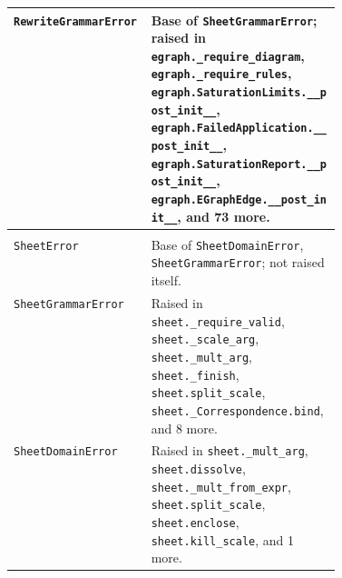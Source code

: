 {\begin{xltabular}{\linewidth}{@{}>{\raggedright\arraybackslash}p{0.42\linewidth}X@{}}
\texttt{RewriteGrammarError}\newline{} & Base of \texttt{SheetGrammarError}; raised in \texttt{egraph.\allowbreak{}\_\allowbreak{}require\_\allowbreak{}diagram}, \texttt{egraph.\allowbreak{}\_\allowbreak{}require\_\allowbreak{}rules}, \texttt{egraph.\allowbreak{}SaturationLimits.\allowbreak{}\_\allowbreak{}\_\allowbreak{}post\_\allowbreak{}init\_\allowbreak{}\_\allowbreak{}}, \texttt{egraph.\allowbreak{}FailedApplication.\allowbreak{}\_\allowbreak{}\_\allowbreak{}post\_\allowbreak{}init\_\allowbreak{}\_\allowbreak{}}, \texttt{egraph.\allowbreak{}SaturationReport.\allowbreak{}\_\allowbreak{}\_\allowbreak{}post\_\allowbreak{}init\_\allowbreak{}\_\allowbreak{}}, \texttt{egraph.\allowbreak{}EGraphEdge.\allowbreak{}\_\allowbreak{}\_\allowbreak{}post\_\allowbreak{}init\_\allowbreak{}\_\allowbreak{}}, and 73 more. \\
\midrule
{}\\*
\texttt{SheetError}\newline{} & Base of \texttt{SheetDomainError}, \texttt{SheetGrammarError}; not raised itself. \\
\texttt{SheetGrammarError}\newline{} & Raised in \texttt{sheet.\allowbreak{}\_\allowbreak{}require\_\allowbreak{}valid}, \texttt{sheet.\allowbreak{}\_\allowbreak{}scale\_\allowbreak{}arg}, \texttt{sheet.\allowbreak{}\_\allowbreak{}mult\_\allowbreak{}arg}, \texttt{sheet.\allowbreak{}\_\allowbreak{}finish}, \texttt{sheet.\allowbreak{}split\_\allowbreak{}scale}, \texttt{sheet.\allowbreak{}\_\allowbreak{}Correspondence.\allowbreak{}bind}, and 8 more. \\
\texttt{SheetDomainError}\newline{} & Raised in \texttt{sheet.\allowbreak{}\_\allowbreak{}mult\_\allowbreak{}arg}, \texttt{sheet.\allowbreak{}dissolve}, \texttt{sheet.\allowbreak{}\_\allowbreak{}mult\_\allowbreak{}from\_\allowbreak{}expr}, \texttt{sheet.\allowbreak{}split\_\allowbreak{}scale}, \texttt{sheet.\allowbreak{}enclose}, \texttt{sheet.\allowbreak{}kill\_\allowbreak{}scale}, and 1 more. \\

\end{xltabular}}
